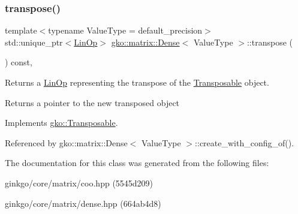 \subsubsection{\texorpdfstring{transpose()}{transpose()}}
{\footnotesize\ttfamily template$<$typename Value\+Type = default\+\_\+precision$>$ \\
std\+::unique\+\_\+ptr$<$\hyperlink{classgko_1_1LinOp}{Lin\+Op}$>$ \hyperlink{classgko_1_1matrix_1_1Dense}{gko\+::matrix\+::\+Dense}$<$ Value\+Type $>$\+::transpose (\begin{DoxyParamCaption}{ }\end{DoxyParamCaption}) const\hspace{0.3cm}{\ttfamily [override]}, {\ttfamily [virtual]}}



Returns a \hyperlink{classgko_1_1LinOp}{Lin\+Op} representing the transpose of the \hyperlink{classgko_1_1Transposable}{Transposable} object. 

\begin{DoxyReturn}{Returns}
a pointer to the new transposed object 
\end{DoxyReturn}


Implements \hyperlink{classgko_1_1Transposable_a5c6b778b71b47d53e0bda6ccf894d318}{gko\+::\+Transposable}.



Referenced by gko\+::matrix\+::\+Dense$<$ Value\+Type $>$\+::create\+\_\+with\+\_\+config\+\_\+of().



The documentation for this class was generated from the following files\+:\begin{DoxyCompactItemize}
\item 
ginkgo/core/matrix/coo.\+hpp (5545d209)\item 
ginkgo/core/matrix/dense.\+hpp (664ab4d8)\end{DoxyCompactItemize}
